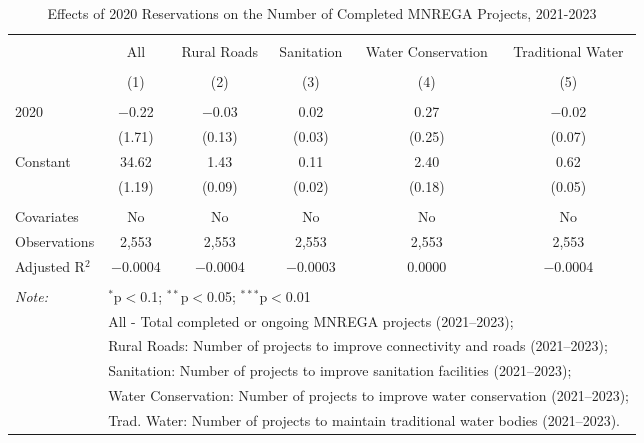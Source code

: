
\begin{table}[!htbp] \centering 
  \caption{Effects of 2020 Reservations on the Number of Completed MNREGA Projects, 2021-2023} 
  \label{main_mnrega_20} 
\scriptsize 
\begin{tabular}{@{\extracolsep{1pt}}lccccc} 
\\[-1.8ex]\hline 
\hline \\[-1.8ex] 
 & All & Rural Roads & Sanitation & Water Conservation & Traditional Water \\ 
\\[-1.8ex] & (1) & (2) & (3) & (4) & (5)\\ 
\hline \\[-1.8ex] 
 2020 & $-$0.22 & $-$0.03 & 0.02 & 0.27 & $-$0.02 \\ 
  & (1.71) & (0.13) & (0.03) & (0.25) & (0.07) \\ 
  Constant & 34.62 & 1.43 & 0.11 & 2.40 & 0.62 \\ 
  & (1.19) & (0.09) & (0.02) & (0.18) & (0.05) \\ 
 \hline \\[-1.8ex] 
Covariates & No & No & No & No & No \\ 
Observations & 2,553 & 2,553 & 2,553 & 2,553 & 2,553 \\ 
Adjusted R$^{2}$ & $-$0.0004 & $-$0.0004 & $-$0.0003 & 0.0000 & $-$0.0004 \\ 
\hline 
\hline \\[-1.8ex] 
\textit{Note:}  & \multicolumn{5}{l}{$^{*}$p$<$0.1; $^{**}$p$<$0.05; $^{***}$p$<$0.01} \\ 
 & \multicolumn{5}{l}{All - Total completed or ongoing MNREGA projects (2021--2023);} \\ 
 & \multicolumn{5}{l}{Rural Roads: Number of projects to improve connectivity and roads (2021--2023);} \\ 
 & \multicolumn{5}{l}{Sanitation:  Number of projects to improve sanitation facilities  (2021--2023);} \\ 
 & \multicolumn{5}{l}{Water Conservation: Number of projects to improve water conservation (2021--2023);} \\ 
 & \multicolumn{5}{l}{Trad. Water: Number of projects to maintain traditional water bodies (2021--2023).} \\ 
\end{tabular} 
\end{table} 
